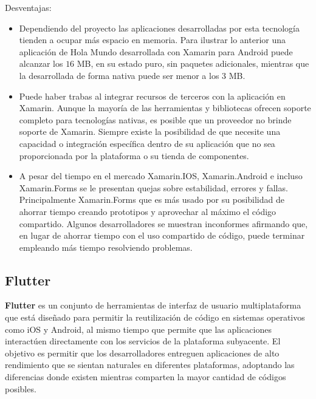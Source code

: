 Desventajas:

\begin{itemize}


\item	Dependiendo del proyecto las aplicaciones desarrolladas por esta tecnología tienden a ocupar más espacio en memoria. Para ilustrar lo anterior una aplicación de Hola Mundo desarrollada con Xamarin para Android puede alcanzar los $16$ MB, en su estado puro, sin paquetes adicionales, mientras que la desarrollada de forma nativa puede ser menor a los $3$ MB.
\item	Puede haber trabas al integrar recursos de terceros con la aplicación en Xamarin. Aunque la mayoría de las herramientas y bibliotecas ofrecen soporte completo para tecnologías nativas, es posible que un proveedor no brinde soporte de Xamarin. Siempre existe la posibilidad de que necesite una capacidad o integración específica dentro de su aplicación que no sea proporcionada por la plataforma o su tienda de componentes.
\item	A pesar del tiempo en el mercado Xamarin.IOS, Xamarin.Android e incluso Xamarin.Forms se le presentan quejas sobre estabilidad, errores y fallas. Principalmente Xamarin.Forms que es más usado por su posibilidad de ahorrar tiempo creando prototipos y aprovechar al máximo el código compartido. Algunos desarrolladores se muestran inconformes afirmando que, en lugar de ahorrar tiempo con el uso compartido de código, puede terminar empleando más tiempo resolviendo problemas.
\end{itemize}																																																																																																																																																																																																																																																																																					


\subsection{Flutter}\label{chapter:introduction}





\textbf{Flutter}  es un conjunto de herramientas de interfaz de usuario multiplataforma que está diseñado para permitir la reutilización de código en sistemas operativos como iOS y Android, al mismo tiempo que permite que las aplicaciones interactúen directamente con los servicios de la plataforma subyacente. El objetivo es permitir que los desarrolladores entreguen aplicaciones de alto rendimiento que se sientan naturales en diferentes plataformas, adoptando las diferencias donde existen mientras comparten la mayor cantidad de códigos posibles.

